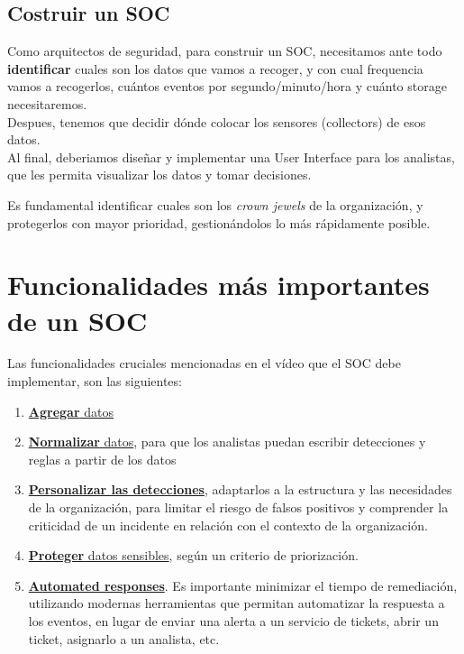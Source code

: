 \subsection{Costruir un SOC}
Como arquitectos de seguridad, para construir un SOC, necesitamos ante todo {\textbf{identificar} cuales son los datos que vamos a recoger, y con cual frequencia vamos a recogerlos}, cuántos eventos por segundo/minuto/hora y cuánto storage necesitaremos.\\
Despues, tenemos que decidir dónde colocar los sensores (collectors) de esos datos.\\
Al final, deberiamos diseñar y implementar una User Interface para los analistas, que les permita visualizar los datos y tomar decisiones.

Es fundamental identificar {cuales son los \textit{crown jewels} de la organización}, y protegerlos con mayor prioridad, gestionándolos lo más rápidamente posible.


\section{Funcionalidades más importantes de un SOC}


{Las funcionalidades cruciales mencionadas en el vídeo que el SOC debe implementar, son las siguientes:\ns
\begin{enumerate}
   \item \ul{\textbf{Agregar} datos}
   \item \ul{\textbf{Normalizar} datos}, para que los analistas puedan escribir detecciones y reglas a partir de los datos
   \item \ul{\textbf{Personalizar las detecciones}}, adaptarlos a la estructura y las necesidades de la organización, para limitar el riesgo de falsos positivos y comprender la criticidad de un incidente en relación con el contexto de la organización.
   \item \ul{\textbf{Proteger} datos sensibles}, según un criterio de priorización.
   \item\ul{\textbf{Automated responses}}. Es importante minimizar el tiempo de remediación, utilizando modernas herramientas que permitan automatizar la respuesta a los eventos, en lugar de enviar una alerta a un servicio de tickets, abrir un ticket, asignarlo a un analista, etc. 
\end{enumerate}
}

